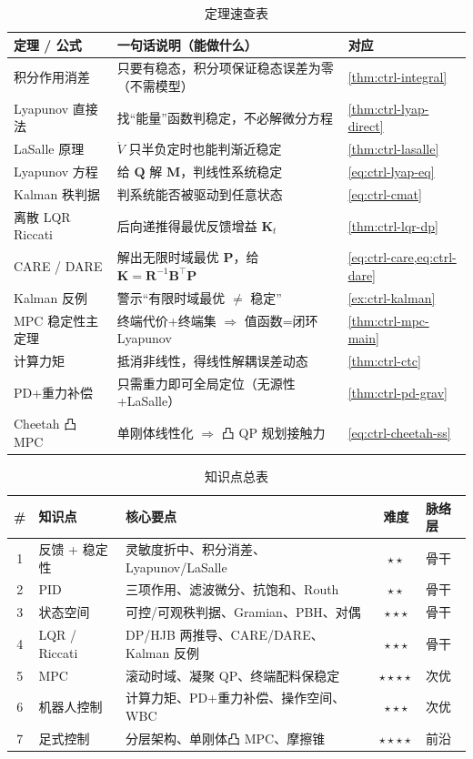 \begin{table}[H]\centering\small
\caption{定理速查表}
\label{tab:ctrl-thm}
\begin{tabular}{lll}
\toprule
定理 / 公式 & 一句话说明（能做什么） & 对应 \\
\midrule
积分作用消差 & 只要有稳态，积分项保证稳态误差为零（不需模型） & \cref{thm:ctrl-integral} \\
Lyapunov 直接法 & 找“能量”函数判稳定，不必解微分方程 & \cref{thm:ctrl-lyap-direct} \\
LaSalle 原理 & $\dot V$ 只半负定时也能判渐近稳定 & \cref{thm:ctrl-lasalle} \\
Lyapunov 方程 & 给 $\mathbf{Q}$ 解 $\mathbf{M}$，判线性系统稳定 & \cref{eq:ctrl-lyap-eq} \\
Kalman 秩判据 & 判系统能否被驱动到任意状态 & \cref{eq:ctrl-cmat} \\
离散 LQR Riccati & 后向递推得最优反馈增益 $\mathbf{K}_t$ & \cref{thm:ctrl-lqr-dp} \\
CARE / DARE & 解出无限时域最优 $\mathbf{P}$，给 $\mathbf{K}=\mathbf{R}^{-1}\mathbf{B}^\top\mathbf{P}$ & \cref{eq:ctrl-care,eq:ctrl-dare} \\
Kalman 反例 & 警示“有限时域最优 $\ne$ 稳定” & \cref{ex:ctrl-kalman} \\
MPC 稳定性主定理 & 终端代价+终端集 $\Rightarrow$ 值函数=闭环 Lyapunov & \cref{thm:ctrl-mpc-main} \\
计算力矩 & 抵消非线性，得线性解耦误差动态 & \cref{thm:ctrl-ctc} \\
PD+重力补偿 & 只需重力即可全局定位（无源性+LaSalle） & \cref{thm:ctrl-pd-grav} \\
Cheetah 凸 MPC & 单刚体线性化 $\Rightarrow$ 凸 QP 规划接触力 & \cref{eq:ctrl-cheetah-ss} \\
\bottomrule
\end{tabular}
\end{table}

\begin{table}[H]\centering\small
\caption{知识点总表}
\label{tab:ctrl-points}
\begin{tabular}{cllcl}
\toprule
\# & 知识点 & 核心要点 & 难度 & 脉络层 \\
\midrule
1 & 反馈 + 稳定性 & 灵敏度折中、积分消差、Lyapunov/LaSalle & \(\star\star\) & 骨干 \\
2 & PID & 三项作用、滤波微分、抗饱和、Routh & \(\star\star\) & 骨干 \\
3 & 状态空间 & 可控/可观秩判据、Gramian、PBH、对偶 & \(\star\star\star\) & 骨干 \\
4 & LQR / Riccati & DP/HJB 两推导、CARE/DARE、Kalman 反例 & \(\star\star\star\) & 骨干 \\
5 & MPC & 滚动时域、凝聚 QP、终端配料保稳定 & \(\star\star\star\star\) & 次优 \\
6 & 机器人控制 & 计算力矩、PD+重力补偿、操作空间、WBC & \(\star\star\star\) & 次优 \\
7 & 足式控制 & 分层架构、单刚体凸 MPC、摩擦锥 & \(\star\star\star\star\) & 前沿 \\
\bottomrule
\end{tabular}
\end{table}

